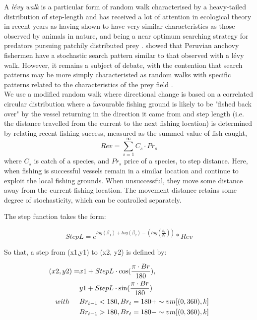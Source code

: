 \documentclass[review]{elsarticle}
\begin{document}
A \textit{lévy walk} is a particular form of random walk characterised by a
heavy-tailed distribution of step-length and has received a lot of attention in
ecological theory in recent years as having shown to have very similar
characteristics as those observed by animals in nature, and being a near
optimum searching strategy for predators pursuing patchily distributed prey
\cite{Bartumeus2005, Sims2008}.  \cite{Bertrand2007} showed that Peruvian
anchovy fishermen have a stochastic search pattern similar to that observed
with a lévy walk. However, it remains a subject of debate, with the contention
that search patterns may be more simply characteristed as random walks
\cite{Sakiyama2013} with specific patterns related to the characteristics of
the prey field \cite{Sims2012}. \\

We use a modified random walk where directional change is based on a correlated
circular distribution where a favourable fishing ground is likely to be "fished
back over" by the vessel returning in the direction it came from and step
length (i.e. the distance travelled from the current to the next fishing
location) is determined by relating recent fishing success, measured as the
summed value of fish caught, $$Rev = \sum_{s=1}^{\infty} C_{s} \cdot Pr_{s}$$
where $C_{s}$ is catch of a species, and $Pr_{s}$ price of a species, to step
distance. Here, when fishing is successful vessels remain in a similar location
and continue to exploit the local fishing grounds. When unsuccessful, they move
some distance away from the current fishing location. The movement distance
retains some degree of stochasticity, which can be controlled separately. 

The step function takes the form:

\begin{equation*}
	StepL = e^{log(\beta_{1}) + log(\beta_{2}) - (log(\frac{\beta_{1}}{\beta_{3}}))} * Rev
\end{equation*}

So that, a step from (x1,y1) to (x2, y2) is defined by:

\begin{equation*}
	\begin{split}
 (x2, y2) =  & x1 + StepL \cdot \cos (\frac{\pi \cdot Br}{180}), \\
             & y1 + StepL \cdot \sin (\frac{\pi \cdot Br}{180}) \\	
 with  \hspace{0.5cm}     & Br_{t-1} < 180, Br_{t} = 180 + \sim vm[(0,360), k] \\
 			  & Br_{t-1} > 180, Br_{t} = 180 - \sim vm[(0,360), k] \\
	\end{split}
\end{equation*}
\end{document}
